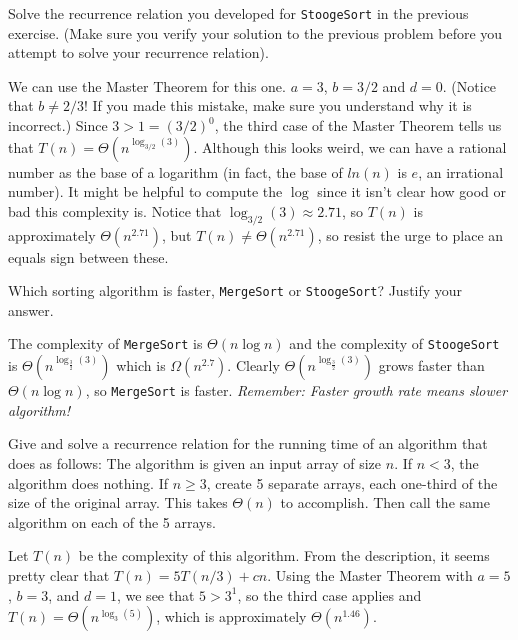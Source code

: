 \newpage

\begin{exer}
Solve the recurrence relation you developed for \verb+StoogeSort+ in the previous exercise.
(Make sure you verify your solution to the previous problem before you attempt to solve
your recurrence relation).
\vspace*{2in}
\begin{answer}
We can use the Master Theorem for this one.  
$a=3$, $b=3/2$ and $d=0$.  
(Notice that $b\neq 2/3$!  If you made this mistake, make sure you understand why it is incorrect.)
Since $3>1=(3/2)^0$, the third case of the Master Theorem tells us that
$T(n)=\Theta\left(n^{\log_{3/2}(3)}\right)$.  Although this looks weird, we can have a rational number as
the base of a logarithm (in fact, the base of $ln(n)$ is $e$, an irrational number).
It might be helpful to compute the $\log$ since it isn't clear how good or bad this complexity is.
Notice that $\log_{3/2}(3)\approx 2.71$, so $T(n)$ is approximately $\Theta(n^{2.71})$, but 
$T(n)\neq \Theta(n^{2.71})$, so resist the urge to place an equals sign between these.
\end{answer}
\end{exer}

\begin{ques}
Which sorting algorithm is faster, \verb+MergeSort+ or \verb+StoogeSort+?
Justify your answer.

\noindent
\answerlinethree
\begin{answer}
The complexity of \verb+MergeSort+ is $\Theta(n\log n)$ and the complexity of
\verb+StoogeSort+ is $\Theta\left(n^{\log_\frac{3}{2}(3)}\right)$
which is $\Omega(n^{2.7})$.
Clearly $\Theta\left(n^{\log_\frac{3}{2}(3)}\right)$ grows faster than $\Theta(n\log n)$,
so \verb+MergeSort+ is faster. 
{\em Remember: Faster growth rate means slower algorithm!}
\end{answer}
\end{ques}

\begin{exer}
Give and solve a recurrence relation for the running time of an algorithm that does as follows:
The algorithm is given an input array of size $n$.
If $n<3$, the algorithm does nothing.
If $n\geq 3$, create 5 separate arrays, 
each one-third of the size of the original array.
This takes $\Theta(n)$ to accomplish.  
Then call the same algorithm on each of the 5 arrays.
\vspace*{3in}
\begin{answer}
Let $T(n)$ be the complexity of this algorithm.
From the description, it seems pretty clear that $T(n)=5T(n/3)+cn$.
Using the Master Theorem with $a=5$, $b=3$, and $d=1$, we see that $5>3^1$, 
so the third case applies and $T(n)=\Theta\left(n^{\log_3(5)}\right)$,
which is approximately $\Theta(n^{1.46})$.
\end{answer}
\end{exer}

